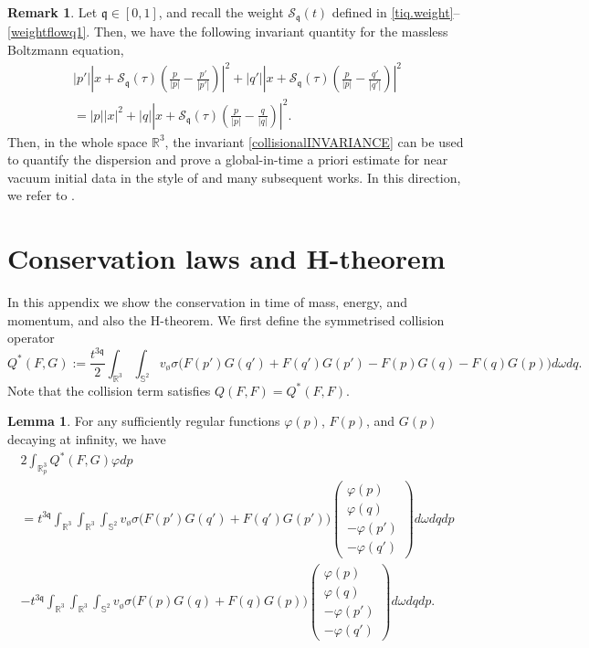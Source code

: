 \documentclass[reqno]{amsart}
\newcommand{\pv}{p}
\newcommand{\qv}{q}
\def\R{\mathbb R}
\newcommand{\qq}{\mathfrak{q}}
\newcommand{\Emptyset}{\text{\o}}
\newcommand{\tiq}{\mathcal{S}_{\qq}}
\theoremstyle{definition}
\newtheorem{lemma}[theorem]{Lemma}
\newtheorem{remark}[theorem]{Remark}
\numberwithin{equation}{section}
\numberwithin{theorem}{section}
\begin{document}
\begin{remark}
    Let \(\qq\in [0,1]\), and recall the weight \(\tiq(t)\) defined in \eqref{tiq.weight}--\eqref{weightflowq1}. Then, we have the following invariant quantity for the massless Boltzmann equation,
\begin{multline}\label{collisionalINVARIANCE}
    |\pv'| \left|x+\tiq(\tau)\left(\frac{\pv}{ |\pv|}-\frac{\pv'}{ |\pv'|}\right)\right|^2 
    +
|\qv'| \left|x+\tiq(\tau)\left(\frac{\pv}{ |\pv|}-\frac{\qv'}{ |\qv'|}\right)\right|^2 
  \\
  =
|\pv| |x|^2
+
|\qv| \left|x+\tiq(\tau)\left(\frac{\pv}{ |\pv|}-\frac{\qv}{ |\qv|}\right)\right|^2. 
\end{multline}
Then, in the whole space $\R^3$, the invariant \eqref{collisionalINVARIANCE} can be used to quantify the dispersion and prove a global-in-time a priori estimate for near vacuum initial data in the style of \cite{MR0760333} and many subsequent works.  In this direction, we refer to \cite{GL1996}.  
\end{remark}
   





\appendix




\section{Conservation laws and H-theorem}\label{appconservlaws}

In this appendix we show the conservation in time of mass, energy, and momentum, and also the H-theorem.  We first define the symmetrised collision operator \[Q^*(F,G):=\frac{t^{3\qq}}{2}\int_{\mathbb{R}^3}\int_{\mathbb{S}^2} v_{\Emptyset}\sigma \Big(F(p')G(q')+F(q')G(p')-
F(p)G(q)-F(q)G(p)\Big) d\omega dq.\] Note that the collision term satisfies \(Q(F,F)=Q^*(F,F)\).


\begin{lemma}
For any sufficiently regular functions \(\varphi(p)\), \(F(p)\), and \(G(p)\) decaying at infinity, we have 
\begin{multline*}
       2\int_{\R^3_p} Q^*(F,G)\varphi dp
       \\
=t^{3\qq}\int_{\mathbb{R}^3}\int_{\mathbb{R}^3}\int_{\mathbb{S}^2} v_{\Emptyset}\sigma\big(F(p')G(q')+F(q')G(p')\big)\begin{pmatrix}
        \varphi(p) \\ \varphi (q) \\ -\varphi (p')\\ -\varphi (q')
    \end{pmatrix} d\omega dqdp
    \\
-t^{3\qq}\int_{\mathbb{R}^3}\int_{\mathbb{R}^3}\int_{\mathbb{S}^2} v_{\Emptyset}\sigma\big(F(p)G(q)+F(q)G(p)\big)\begin{pmatrix}
        \varphi(p) \\ \varphi (q) \\ -\varphi (p')\\ -\varphi (q')
    \end{pmatrix} d\omega dqdp.
\end{multline*}
\end{lemma}
\end{document}
